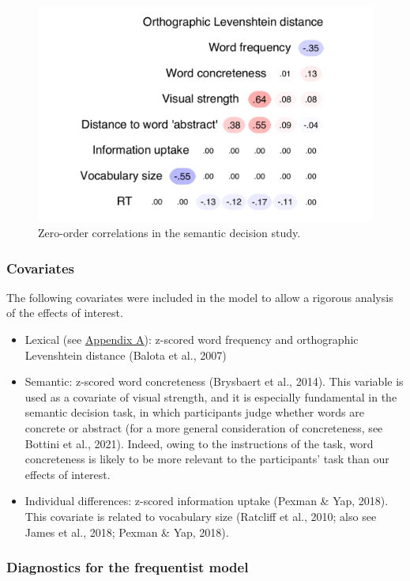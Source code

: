 \documentclass[
  12pt,
  man,floatsintext]{apa7}
\begin{document}
\begin{figure}

{\centering \includegraphics[width=0.57\linewidth]{manuscript_files/figure-latex/semanticdecision-correlations-1} 

}

\caption{Zero-order correlations in the semantic decision study.}\label{fig:semanticdecision-correlations}
\end{figure}

\hypertarget{covariates-1}{%
\subsubsection{Covariates}\label{covariates-1}}

The following covariates were included in the model to allow a rigorous analysis of the effects of interest.

\begin{itemize}
\item
  Lexical (see \protect\hyperlink{appendix-A-lexical-covariates}{\underline{Appendix A}}): z-scored word frequency and orthographic Levenshtein distance (Balota et al., 2007)
\item
  Semantic: z-scored word concreteness (Brysbaert et al., 2014). This variable is used as a covariate of visual strength, and it is especially fundamental in the semantic decision task, in which participants judge whether words are concrete or abstract (for a more general consideration of concreteness, see Bottini et al., 2021). Indeed, owing to the instructions of the task, word concreteness is likely to be more relevant to the participants' task than our effects of interest.
\item
  Individual differences: z-scored information uptake (Pexman \& Yap, 2018). This covariate is related to vocabulary size (Ratcliff et al., 2010; also see James et al., 2018; Pexman \& Yap, 2018).
\end{itemize}

\hypertarget{diagnostics-for-the-frequentist-model-2}{%
\subsubsection{Diagnostics for the frequentist model}\label{diagnostics-for-the-frequentist-model-2}}
\end{document}

